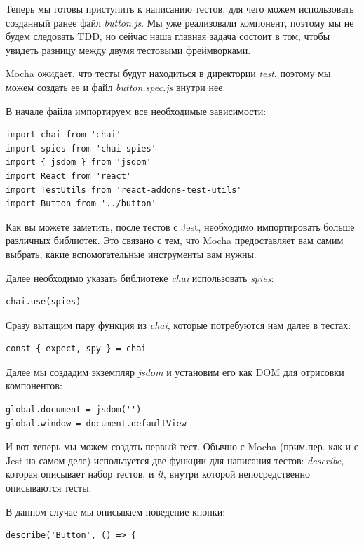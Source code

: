 Теперь мы готовы приступить к написанию тестов, для чего можем использовать созданный ранее файл \textit{button.js}. Мы уже реализовали компонент, поэтому мы не будем следовать TDD, но сейчас наша главная задача состоит в том, чтобы увидеть разницу между двумя тестовыми фреймворками.

Mocha ожидает, что тесты будут находиться в директории \textit{test}, поэтому мы можем создать ее и файл \textit{button.spec.js} внутри нее.

В начале файла импортируем все необходимые зависимости:

\begin{lstlisting}
import chai from 'chai'
import spies from 'chai-spies'
import { jsdom } from 'jsdom'
import React from 'react'
import TestUtils from 'react-addons-test-utils'
import Button from '../button'
\end{lstlisting}

Как вы можете заметить, после тестов с Jest, необходимо импортировать больше различных библиотек. Это связано с тем, что Mocha предоставляет вам самим выбрать, какие вспомогательные инструменты вам нужны.

Далее необходимо указать библиотеке \textit{chai} использовать \textit{spies}:

\begin{lstlisting}
chai.use(spies)
\end{lstlisting}

Сразу вытащим пару функция из \textit{chai}, которые потребуются нам далее в тестах:

\begin{lstlisting}
const { expect, spy } = chai
\end{lstlisting}

Далее мы создадим экземпляр \textit{jsdom} и установим его как DOM для отрисовки компонентов:

\begin{lstlisting}
global.document = jsdom('')
global.window = document.defaultView
\end{lstlisting}

И вот теперь мы можем создать первый тест. Обычно с Mocha (прим.пер. как и с Jest на самом деле) используется две функции для написания тестов: \textit{describe}, которая описывает набор тестов, и \textit{it}, внутри которой непосредственно описываются тесты.

В данном случае мы описываем поведение кнопки:

\begin{lstlisting}
describe('Button', () => {
\end{lstlisting}

